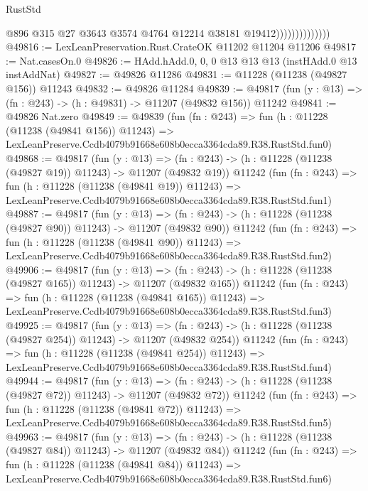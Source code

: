 \begin{lexlean}{RustStd}
\begin{coremodule}
                                @896
                                @315
                                @27
                                @3643
                                @3574
                                @4764
                                @12214
                                @38181
                                @19412))))))))))))))
@49816 := LexLeanPreservation.Rust.CrateOK @11202 @11204 @11206
@49817 := Nat.casesOn.{0}
@49826 := HAdd.hAdd.{0, 0, 0} @13 @13 @13 (instHAdd.{0} @13 instAddNat)
@49827 := @49826 @11286
@49831 := @11228 (@11238 (@49827 @156)) @11243
@49832 := @49826 @11284
@49839 := @49817 (fun (y : @13) => (fn : @243) -> (h : @49831) -> @11207 (@49832 @156)) @11242
@49841 := @49826 Nat.zero
@49849 := @49839
    (fun (fn : @243) =>
    fun (h : @11228 (@11238 (@49841 @156)) @11243) =>
    LexLeanPreserve.Ccdb4079b91668e608b0ecca3364cda89.R38.RustStd.fun0)
@49868 := @49817
    (fun (y : @13) =>
    (fn : @243) -> (h : @11228 (@11238 (@49827 @19)) @11243) -> @11207 (@49832 @19))
    @11242
    (fun (fn : @243) =>
    fun (h : @11228 (@11238 (@49841 @19)) @11243) =>
    LexLeanPreserve.Ccdb4079b91668e608b0ecca3364cda89.R38.RustStd.fun1)
@49887 := @49817
    (fun (y : @13) =>
    (fn : @243) -> (h : @11228 (@11238 (@49827 @90)) @11243) -> @11207 (@49832 @90))
    @11242
    (fun (fn : @243) =>
    fun (h : @11228 (@11238 (@49841 @90)) @11243) =>
    LexLeanPreserve.Ccdb4079b91668e608b0ecca3364cda89.R38.RustStd.fun2)
@49906 := @49817
    (fun (y : @13) =>
    (fn : @243) -> (h : @11228 (@11238 (@49827 @165)) @11243) -> @11207 (@49832 @165))
    @11242
    (fun (fn : @243) =>
    fun (h : @11228 (@11238 (@49841 @165)) @11243) =>
    LexLeanPreserve.Ccdb4079b91668e608b0ecca3364cda89.R38.RustStd.fun3)
@49925 := @49817
    (fun (y : @13) =>
    (fn : @243) -> (h : @11228 (@11238 (@49827 @254)) @11243) -> @11207 (@49832 @254))
    @11242
    (fun (fn : @243) =>
    fun (h : @11228 (@11238 (@49841 @254)) @11243) =>
    LexLeanPreserve.Ccdb4079b91668e608b0ecca3364cda89.R38.RustStd.fun4)
@49944 := @49817
    (fun (y : @13) =>
    (fn : @243) -> (h : @11228 (@11238 (@49827 @72)) @11243) -> @11207 (@49832 @72))
    @11242
    (fun (fn : @243) =>
    fun (h : @11228 (@11238 (@49841 @72)) @11243) =>
    LexLeanPreserve.Ccdb4079b91668e608b0ecca3364cda89.R38.RustStd.fun5)
@49963 := @49817
    (fun (y : @13) =>
    (fn : @243) -> (h : @11228 (@11238 (@49827 @84)) @11243) -> @11207 (@49832 @84))
    @11242
    (fun (fn : @243) =>
    fun (h : @11228 (@11238 (@49841 @84)) @11243) =>
    LexLeanPreserve.Ccdb4079b91668e608b0ecca3364cda89.R38.RustStd.fun6)

\end{coremodule}
\end{lexlean}

